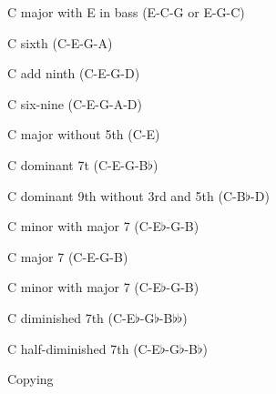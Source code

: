                                              C major with E in bass (E-C-G or E-G-C)\hfil\break

                                      C sixth (C-E-G-A)\hfil\break

                                      C add ninth (C-E-G-D)\hfil\break

                                    C six-nine (C-E-G-A-D)\hfil\break

                            C major without 5th (C-E)\hfil\break

                                      C dominant 7t (C-E-G-B$\flat$)\hfil\break

                 C dominant 9th without 3rd and 5th (C-B$\flat$-D)\hfil\break

                             C minor with major 7 (C-E$\flat$-G-B)\hfil\break

                              C major 7 (C-E-G-B)\hfil\break

                             C minor with major 7 (C-E$\flat$-G-B)\hfil\break

                                  C diminished 7th (C-E$\flat$-G$\flat$-B$\flat\flat$)\hfil\break

                           C half-diminished 7th (C-E$\flat$-G$\flat$-B$\flat$)\hfil\break

\vfil\eject
\centerline{\Largebx Copying}
\baselineskip
{}

\bye


